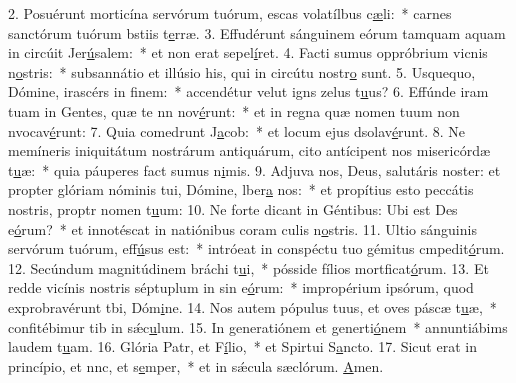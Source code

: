 2. Posuérunt morticína servórum tuórum, escas volatílbus c\uline{æ}li:~* carnes sanctórum tuórum bstiis t\uline{e}rræ.
3. Effudérunt sánguinem eórum tamquam aquam in circúit Jer\uline{ú}salem:~* et non erat  sepel\uline{í}ret.
4. Facti sumus oppróbrium vicnis n\uline{o}stris:~* subsannátio et illúsio his, qui in circútu nostr\uline{o} sunt.
5. Usquequo, Dómine, irascérs in f\uline{i}nem:~* accendétur velut igns zelus t\uline{u}us?
6. Effúnde iram tuam in Gentes, quæ te nn nov\uline{é}runt:~* et in regna quæ nomen tuum non nvocav\uline{é}runt:
7. Quia comedrunt J\uline{a}cob:~* et locum ejus dsolav\uline{é}runt.
8. Ne memíneris iniquitátum nostrárum antiquárum, cito antícipent nos misericórdæ t\uline{u}æ:~* quia páuperes fact sumus n\uline{i}mis.
9. Adjuva nos, Deus, salutáris noster: et propter glóriam nóminis tui, Dómine, lber\uline{a} nos:~* et propítius esto peccátis nostris, proptr nomen t\uline{u}um:
10. Ne forte dicant in Géntibus: Ubi est Des e\uline{ó}rum?~* et innotéscat in natiónibus coram culis n\uline{o}stris.
11. Ultio sánguinis servórum tuórum,  eff\uline{ú}sus est:~* intróeat in conspéctu tuo gémitus cmpedit\uline{ó}rum.
12. Secúndum magnitúdinem bráchi t\uline{u}i,~* pósside fílios mortficat\uline{ó}rum.
13. Et redde vicínis nostris séptuplum in sin e\uline{ó}rum:~* impropérium ipsórum, quod exprobravérunt tbi, Dóm\uline{i}ne.
14. Nos autem pópulus tuus, et oves páscæ t\uline{u}æ,~* confitébimur tib in sǽc\uline{u}lum.
15. In generatiónem et generti\uline{ó}nem~* annuntiábims laudem t\uline{u}am.
16. Glória Patr, et F\uline{í}lio,~* et Spirtui S\uline{a}ncto.
17. Sicut erat in princípio, et nnc, et s\uline{e}mper,~* et in sǽcula sæclórum. \uline{A}men.
